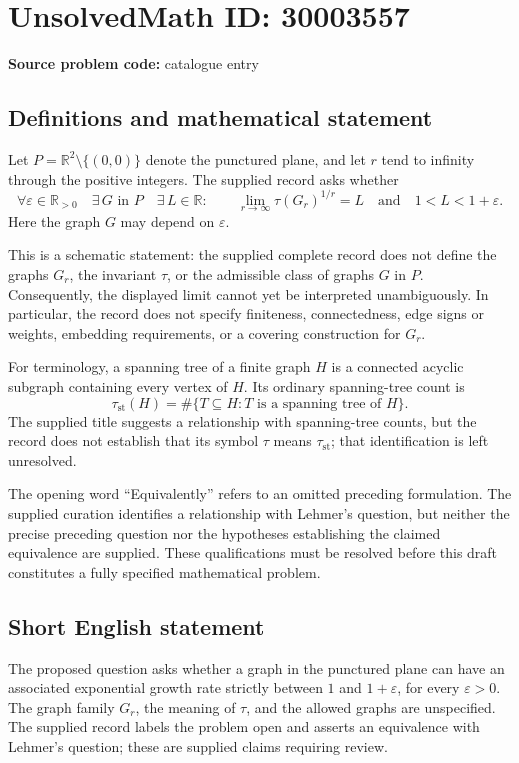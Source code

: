 \documentclass[11pt]{article}
\newcommand{\R}{\mathbb{R}}
\begin{document}
\section*{UnsolvedMath ID: 30003557}
\textbf{Source problem code:} catalogue entry
\subsection{Definitions and mathematical statement}
Let \(P=\R^2\setminus\{(0,0)\}\) denote the punctured plane, and let \(r\) tend to infinity through the positive integers. The supplied record asks whether
\[
\forall\varepsilon\in\R_{>0}\quad \exists\,G\text{ in }P\quad \exists\,L\in\R:\qquad
\lim_{r\to\infty}\tau(G_r)^{1/r}=L
\quad\text{and}\quad
1<L<1+\varepsilon.
\]
Here the graph \(G\) may depend on \(\varepsilon\).

This is a schematic statement: the supplied complete record does not define the graphs \(G_r\), the invariant \(\tau\), or the admissible class of graphs \(G\) in \(P\). Consequently, the displayed limit cannot yet be interpreted unambiguously. In particular, the record does not specify finiteness, connectedness, edge signs or weights, embedding requirements, or a covering construction for \(G_r\).

For terminology, a spanning tree of a finite graph \(H\) is a connected acyclic subgraph containing every vertex of \(H\). Its ordinary spanning-tree count is
\[
\tau_{\mathrm{st}}(H)=\#\{T\subseteq H:T\text{ is a spanning tree of }H\}.
\]
The supplied title suggests a relationship with spanning-tree counts, but the record does not establish that its symbol \(\tau\) means \(\tau_{\mathrm{st}}\); that identification is left unresolved.

The opening word ``Equivalently'' refers to an omitted preceding formulation. The supplied curation identifies a relationship with Lehmer's question, but neither the precise preceding question nor the hypotheses establishing the claimed equivalence are supplied. These qualifications must be resolved before this draft constitutes a fully specified mathematical problem.
\subsection{Short English statement}
The proposed question asks whether a graph in the punctured plane can have an associated exponential growth rate strictly between \(1\) and \(1+\varepsilon\), for every \(\varepsilon>0\). The graph family \(G_r\), the meaning of \(\tau\), and the allowed graphs are unspecified. The supplied record labels the problem open and asserts an equivalence with Lehmer's question; these are supplied claims requiring review.
\end{document}
